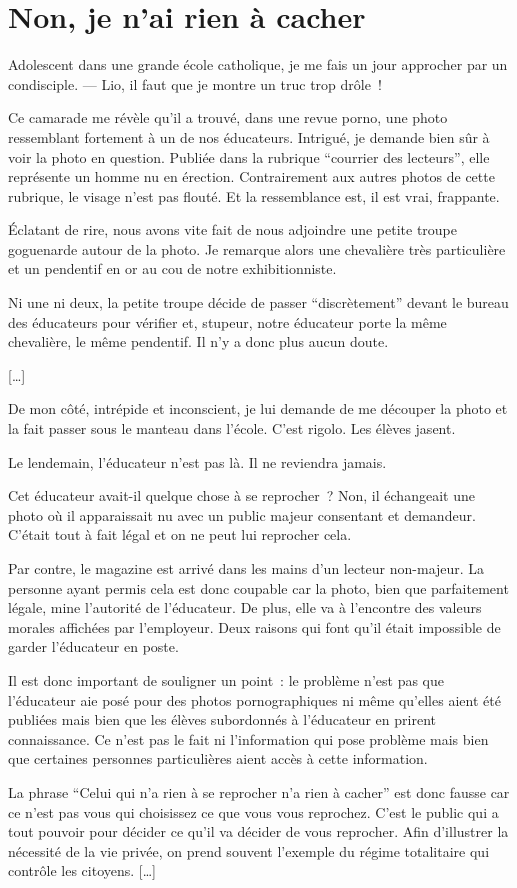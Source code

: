 \section{Non, je n'ai rien à cacher}

Adolescent dans une grande école catholique, je me fais un jour approcher par un condisciple.
--- Lio, il faut que je montre un truc trop drôle !

Ce camarade me révèle qu'il a trouvé, dans une revue porno, une photo ressemblant fortement à un de nos éducateurs. Intrigué, je demande bien sûr à voir la photo en question. Publiée dans la rubrique \enquote{courrier des lecteurs}, elle représente un homme nu en érection. Contrairement aux autres photos de cette rubrique, le visage n'est pas flouté. Et la ressemblance est, il est vrai, frappante.

Éclatant de rire, nous avons vite fait de nous adjoindre une petite troupe goguenarde autour de la photo. Je remarque alors une chevalière très particulière et un pendentif en or au cou de notre exhibitionniste.

Ni une ni deux, la petite troupe décide de passer \enquote{discrètement} devant le bureau des éducateurs pour vérifier et, stupeur, notre éducateur porte la même chevalière, le même pendentif. Il n'y a donc plus aucun doute.

[…]

De mon côté, intrépide et inconscient, je lui demande de me découper la photo et la fait passer sous le manteau dans l'école. C'est rigolo. Les élèves jasent.

Le lendemain, l'éducateur n'est pas là. Il ne reviendra jamais.

Cet éducateur avait-il quelque chose à se reprocher ? Non, il échangeait une photo où il apparaissait nu avec un public majeur consentant et demandeur. C'était tout à fait légal et on ne peut lui reprocher cela.

Par contre, le magazine est arrivé dans les mains d'un lecteur non-majeur. La personne ayant permis cela est donc coupable car la photo, bien que parfaitement légale, mine l'autorité de l'éducateur. De plus, elle va à l'encontre des valeurs morales affichées par l'employeur. Deux raisons qui font qu'il était impossible de garder l'éducateur en poste.

Il est donc important de souligner un point : le problème n'est pas que l'éducateur aie posé pour des photos pornographiques ni même qu'elles aient été publiées mais bien que les élèves subordonnés à l'éducateur en prirent connaissance. Ce n'est pas le fait ni l'information qui pose problème mais bien que certaines personnes particulières aient accès à cette information.

La phrase \enquote{Celui qui n'a rien à se reprocher n'a rien à cacher} est donc fausse car ce n'est pas vous qui choisissez ce que vous vous reprochez. C'est le public qui a tout pouvoir pour décider ce qu'il va décider de vous reprocher. Afin d'illustrer la nécessité de la vie privée, on prend souvent l'exemple du régime totalitaire qui contrôle les citoyens. […]
